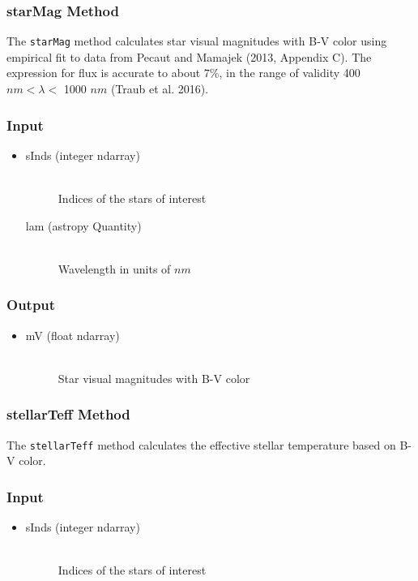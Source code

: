 \documentclass[cleanfoot]{asme2ej}
\begin{document}
\subsubsection{starMag Method} \label{sec:starMagtask}
The \verb+starMag+ method calculates star visual magnitudes with B-V color using empirical fit to data from Pecaut and Mamajek (2013, Appendix C). The expression for flux is accurate to about $7\%$, in the range of validity 400 $ nm < \lambda < $ 1000 $ nm $ (Traub et al. 2016).
\subsubsection*{Input}
\begin{itemize}
\item 
\begin{description}
    \item[sInds (integer ndarray)] \hfill \\ Indices of the stars of interest
    \item[lam (astropy Quantity)] \hfill \\ Wavelength in units of $ nm $
\end{description}
\end{itemize}
\subsubsection*{Output}
\begin{itemize}
\item
\begin{description}
    \item[mV (float ndarray)] \hfill \\ Star visual magnitudes with B-V color
\end{description}
\end{itemize}

\subsubsection{stellarTeff Method} \label{sec:stellarTefftask}
The \verb+stellarTeff+ method calculates the effective stellar temperature based on B-V color.
\subsubsection*{Input}
\begin{itemize}
\item 
\begin{description}
    \item[sInds (integer ndarray)] \hfill \\ Indices of the stars of interest
\end{description}
\end{itemize}
\end{document}
